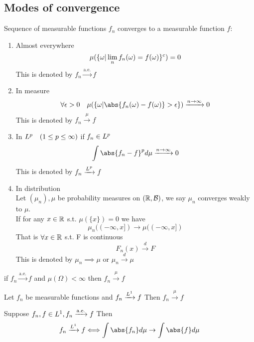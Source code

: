 \subsection{Modes of convergence}
\begin{dfn}
Sequence of measurable functions $f_n$ converges to a measurable function $f$:
\begin{enumerate}
    \item Almost everywhere
    \begin{equation*}
        \mu(\{\omega| \lim\limits_{n} f_n(\omega) = f(\omega)\}^c) = 0
    \end{equation*}
    This is denoted by $f_n \xrightarrow{\text{a.e.}}f$
    \item In measure 
    \begin{equation*}
        \forall \epsilon >0 \quad \mu(\{\omega| \abs{f_n(\omega) - f(\omega)}>\epsilon \}) \xrightarrow{n \rightarrow \infty} 0
    \end{equation*}
    This is denoted by $f_n \xrightarrow{\mu}f$
    \item In $L^{p} \quad (1\leq p \leq \infty)$ if $f_n\in L^{p}$ \begin{equation*}
        \int \abs{f_n - f}^p d\mu \xrightarrow{n \rightarrow \infty} 0
    \end{equation*}
    This is denoted by $f_n \xrightarrow{L^{p}}f$
    \item In distribution \\
    Let $(\mu_n), \mu$ be probability measures on $(\mathbb{R}, \mathcal{B})$, we say $\mu_n$ converges weakly to $\mu$.\\
    If for any $x\in \mathbb{R}$ s.t. $\mu(\{x\}) = 0$ we have 
\begin{equation*}
\mu_n((-\infty,x]) \rightarrow \mu((-\infty,x]) 
\end{equation*}That is $\forall x\in \mathbb{R} $ s.t. F is continuous 
\begin{equation*}
    F_n(x) \xrightarrow{d} F
\end{equation*}This is denoted by $\mu_n \implies\mu$ or $\mu_n \xrightarrow{d}\mu$
\end{enumerate}












\end{dfn}
\begin{lem} if $f_n \xrightarrow{\text{a.e.}}f$ and $\mu(\Omega) < \infty$ then $f_n \xrightarrow{\mu}f$
\end{lem}
\begin{lem}\label{l1mu}
Let $f_n$ be measurable functions and $f_n \xrightarrow{L^{1}}f$ Then $f_n \xrightarrow{\mu}f$
\end{lem}
\begin{lem} Suppose $f_n, f\in L^{1}, f_n \xrightarrow{\text{a.e.}}f$ Then
\begin{equation*}
    f_n \xrightarrow{\ls{1}}f \Longleftrightarrow \int \abs{f_n} d\mu \rightarrow \int \abs{f} d\mu
\end{equation*}
\end{lem}

